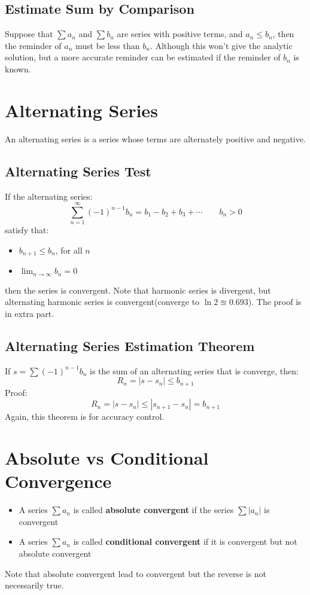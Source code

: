 \documentclass[10pt,a4paper,oneside]{article}
\begin{document}
\subsection{Estimate Sum by Comparison}
Suppose that $\sum a_n$ and $\sum b_n$ are series with positive terms, and $a_n \leq b_n$, then the reminder of $a_n$ must be less than $b_n$. Although this won't give the analytic solution, but a more accurate reminder can be estimated if the reminder of $b_n$ is known.

\section{Alternating Series}
An alternating series is a series whose terms are alternately positive and negative.

\subsection{Alternating Series Test}
If the alternating series:
\[
\sum_{n=1}^{\infty} (-1)^{n-1} b_n = b_1 - b_2 + b_3 +  \cdots \qquad b_n>0
\]
satisfy that:
\begin{itemize}
	\item $b_{n+1} \leq b_n$, for all $n$
	\item $\lim_{n \rightarrow \infty} b_n = 0$ 
\end{itemize}
then the series is convergent. Note that harmonic series is divergent, but alternating harmonic series is convergent(converge to $\ln 2 \approxeq 0.693$). The proof is in extra part.

\subsection{Alternating Series Estimation Theorem}
If $s = \sum (-1)^{n-1} b_n$ is the sum of an alternating series that is converge, then:
\[
R_n = |s - s_n| \leq b_{n+1}
\]
Proof:
\[
R_n = |s - s_n| \leq |s_{n+1} - s_n| = b_{n+1}
\]
Again, this theorem is for accuracy control.

\section{Absolute vs Conditional Convergence}
\begin{itemize}
	\item A series $\sum a_n$ is called \textbf{absolute convergent} if the series $\sum |a_n|$ is convergent
	\item  A series $\sum a_n$ is called \textbf{conditional convergent} if it is convergent but not absolute convergent
\end{itemize}
Note that absolute convergent lead to convergent but the reverse is not necessarily true.
\end{document}
